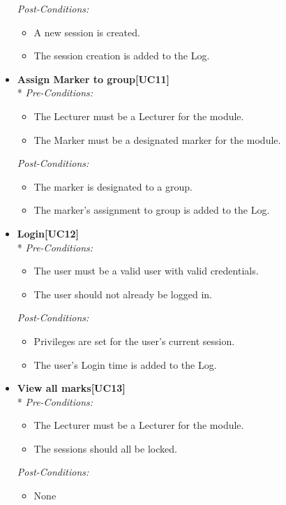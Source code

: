 \documentclass[a4paper]{article}
\begin{document}
\begin{itemize}
						\textit{Post-Conditions:}
								\begin{itemize}
									\item A new session is created.
									\item The session creation is added to the Log.
								\end{itemize}
														
				\item	\textbf{Assign Marker to group[UC11]}\\*
						\textit{Pre-Conditions:}
								\begin{itemize}
									\item The Lecturer must be a Lecturer for the module.
									\item The Marker must be a designated marker for the module.
								\end{itemize}
								
						\textit{Post-Conditions:}
								\begin{itemize}
									\item The marker is designated to a group.
									\item The marker's assignment to group is added to the Log.
								\end{itemize}
														
				\item	\textbf{Login[UC12]}\\*
						\textit{Pre-Conditions:}
								\begin{itemize}
									\item The user must be a valid user with valid credentials.
									\item The user should not already be logged in.
								\end{itemize}
								
						\textit{Post-Conditions:}
								\begin{itemize}
									\item Privileges are set for the user's current session.
									\item The user's Login time is added to the Log.
								\end{itemize}
														
				\item	\textbf{View all marks[UC13]}\\*
						\textit{Pre-Conditions:}
								\begin{itemize}
									\item The Lecturer must be a Lecturer for the module.
									\item The sessions should all be locked.
								\end{itemize}
								
						\textit{Post-Conditions:}
								\begin{itemize}
									\item None
								\end{itemize}
			\end{itemize}
\end{document}
